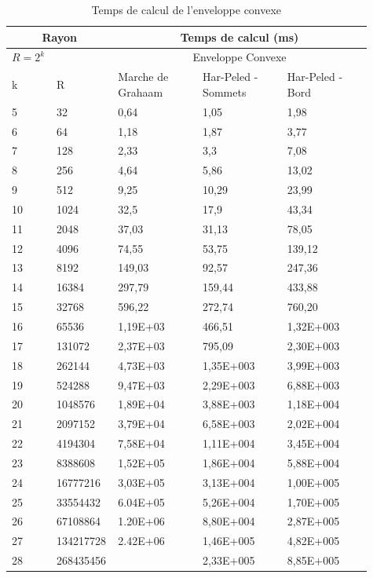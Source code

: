 \begin{table}[H]
  \begin{tabular}{|p{0.09\linewidth}|p{0.13\linewidth}||p{0.23\linewidth}|p{0.23\linewidth}|p{0.23\linewidth}|}
    \hline
    \multicolumn{2}{|c||}{Rayon} & \multicolumn{3}{c|}{Temps de calcul (ms) } \\  \hline 
    $R=2^k$  &  &  \multicolumn{3}{c|}{Enveloppe Convexe}  \\ \hline
    k & R & Marche de Grahaam & Har-Peled - Sommets & Har-Peled - Bord \\
    \hline
    5  & 32        & 0,64     & 1,05      & 1,98\\
    6  & 64        & 1,18     & 1,87      & 3,77\\
    7  & 128       & 2,33     & 3,3       & 7,08\\
    8  & 256       & 4,64     & 5,86      & 13,02\\
    9  & 512       & 9,25     & 10,29     & 23,99\\
    10 & 1024      & 32,5     & 17,9      & 43,34\\
    11 & 2048      & 37,03    & 31,13     & 78,05\\
    12 & 4096      & 74,55    & 53,75     & 139,12\\
    13 & 8192      & 149,03   & 92,57     & 247,36\\
    14 & 16384     & 297,79   & 159,44    & 433,88\\
    15 & 32768     & 596,22   & 272,74    & 760,20\\
    16 & 65536     & 1,19E+03 & 466,51    & 1,32E+003\\
    17 & 131072    & 2,37E+03 & 795,09    & 2,30E+003\\
    18 & 262144    & 4,73E+03 & 1,35E+003 & 3,99E+003\\
    19 & 524288    & 9,47E+03 & 2,29E+003 & 6,88E+003\\
    20 & 1048576   & 1,89E+04 & 3,88E+003 & 1,18E+004\\
    21 & 2097152   & 3,79E+04 & 6,58E+003 & 2,02E+004\\
    22 & 4194304   & 7,58E+04 & 1,11E+004 & 3,45E+004\\
    23 & 8388608   & 1,52E+05 & 1,86E+004 & 5,88E+004\\
    24 & 16777216  & 3,03E+05 & 3,13E+004 & 1,00E+005\\
    25 & 33554432  & 6.04E+05 & 5,26E+004 & 1,70E+005\\
    26 & 67108864  & 1.20E+06 & 8,80E+004 & 2,87E+005\\
    27 & 134217728 & 2.42E+06 & 1,46E+005 & 4,82E+005\\
    28 & 268435456 &          & 2,33E+005 & 8,85E+005\\
    \hline
  \end{tabular} 
  \caption{Temps de calcul de l'enveloppe convexe}
\end{table}


